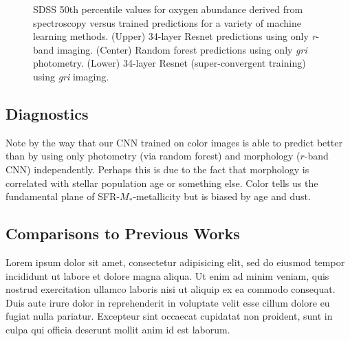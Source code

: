 \documentclass[fleqn,usenatbib]{mnras}
\begin{document}
\begin{figure}
	\caption{\label{prediction-truth-plots}
		SDSS 50th percentile values for oxygen abundance derived from spectroscopy versus trained predictions for a variety of machine learning methods.
		(Upper) 34-layer Resnet predictions using only \textit{r}-band imaging.
		(Center) Random forest predictions using only \textit{gri} photometry.
		(Lower) 34-layer Resnet (super-convergent training) using \textit{gri} imaging.
		}
\end{figure}





\subsection{Diagnostics}\label{sec:diagnostics}
Note by the way that our CNN trained on color images is able to predict better than by using only photometry (via random forest) and morphology ($r$-band CNN) independently.
Perhaps this is due to the fact that morphology is correlated with stellar population age or something else.
Color tells us the fundamental plane of SFR-$M_*$-metallicity but is biased by age and dust.

\subsection{Comparisons to Previous Works}\label{sec:previous work}
Lorem ipsum dolor sit amet, consectetur adipisicing elit, sed do eiusmod tempor incididunt ut labore et dolore magna aliqua. Ut enim ad minim veniam, quis nostrud exercitation ullamco laboris nisi ut aliquip ex ea commodo consequat. Duis aute irure dolor in reprehenderit in voluptate velit esse cillum dolore eu fugiat nulla pariatur. Excepteur sint occaecat cupidatat non proident, sunt in culpa qui officia deserunt mollit anim id est laborum.
\end{document}

